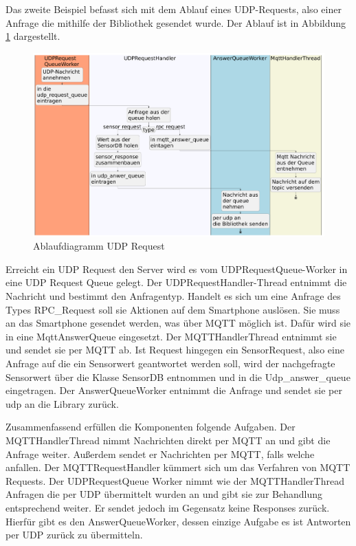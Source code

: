 \documentclass[11pt,a4paper]{report}
\begin{document}
Das zweite Beispiel befasst sich mit dem Ablauf eines UDP-Requests, also einer Anfrage die mithilfe der Bibliothek gesendet wurde.
Der Ablauf ist in Abbildung \ref{fig:serverUDPReqPath} dargestellt.
\begin{figure}[htbp]
  \centering
  \includegraphics[width=\textwidth]{images/UDPRequestServerPath}
  \caption{Ablaufdiagramm UDP Request}
  \label{fig:serverUDPReqPath}
\end{figure}
Erreicht ein UDP Request den Server wird es vom UDPRequestQueue-Worker in eine UDP Request Queue gelegt.
Der UDPRequestHandler-Thread entnimmt die Nachricht und bestimmt den Anfragentyp.
Handelt es sich um eine Anfrage des Types RPC\_Request soll sie Aktionen auf dem Smartphone auslösen.
Sie muss an das Smartphone gesendet werden, was über MQTT möglich ist.
Dafür wird sie in eine MqttAnswerQueue eingesetzt.
Der MQTTHandlerThread entnimmt sie und sendet sie per MQTT ab.
Ist Request hingegen ein SensorRequest, also eine Anfrage auf die ein Sensorwert geantwortet werden soll, wird der nachgefragte Sensorwert über die Klasse SensorDB entnommen und in die Udp\_answer\_queue eingetragen.
Der AnswerQueueWorker entnimmt die Anfrage und sendet sie per udp an die Library zurück.

Zusammenfassend erfüllen die Komponenten folgende Aufgaben.
Der MQTTHandlerThread nimmt Nachrichten direkt per MQTT an und gibt die Anfrage weiter.
Außerdem sendet er Nachrichten per MQTT, falls welche anfallen.
Der MQTTRequestHandler kümmert sich um das Verfahren von MQTT Requests.
Der UDPRequestQueue Worker nimmt wie der MQTTHandlerThread Anfragen die per UDP übermittelt wurden an und gibt sie zur Behandlung entsprechend weiter.
Er sendet jedoch im Gegensatz keine Responses zurück.
Hierfür gibt es den AnswerQueueWorker, dessen einzige Aufgabe es ist Antworten per UDP zurück zu übermitteln.
\end{document}
